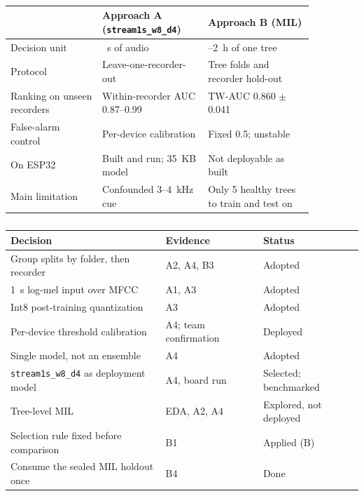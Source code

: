 \begin{table}[htbp]
\centering
\color{black}
\small
\caption{}
\label{tab:ml_compare}
\begin{tabular}{>{\raggedright\arraybackslash}p{0.26\linewidth}>{\raggedright\arraybackslash}p{0.30\linewidth}>{\raggedright\arraybackslash}p{0.30\linewidth}}
\toprule
 & Approach A (\texttt{stream1s\_w8\_d4}) & Approach B (MIL) \\
\midrule
Decision unit & 10~s of audio & 1--2~h of one tree \\
Protocol & Leave-one-recorder-out & Tree folds and recorder hold-out \\
Ranking on unseen recorders & Within-recorder AUC 0.87--0.99 & TW-AUC 0.860 $\pm$ 0.041 \\
False-alarm control & Per-device calibration & Fixed 0.5; unstable \\
On ESP32 & Built and run; 35~KB model & Not deployable as built \\
Main limitation & Confounded 3--4~kHz cue & Only 5 healthy trees to train and test on \\
\bottomrule
\end{tabular}
\end{table}

\begin{table}[htbp]
\centering
\color{black}
\small
\caption{}
\label{tab:ml_decisions}
\begin{tabular}{lll}
\toprule
Decision & Evidence & Status \\
\midrule
Group splits by folder, then recorder & A2, A4, B3 & Adopted \\
1~s log-mel input over MFCC & A1, A3 & Adopted \\
Int8 post-training quantization & A3 & Adopted \\
Per-device threshold calibration & A4; team confirmation & Deployed \\
Single model, not an ensemble & A4 & Adopted \\
\texttt{stream1s\_w8\_d4} as deployment model & A4, board run & Selected; benchmarked \\
Tree-level MIL & EDA, A2, A4 & Explored, not deployed \\
Selection rule fixed before comparison & B1 & Applied (B) \\
Consume the sealed MIL holdout once & B4 & Done \\
\bottomrule
\end{tabular}
\end{table}

